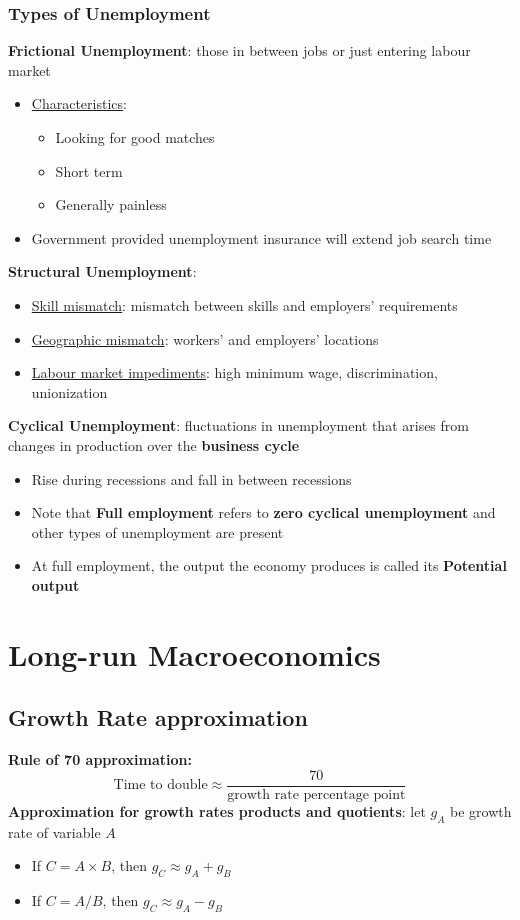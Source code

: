 \documentclass{article}
\begin{document}
\begin{multicols}{2}
\subsubsection{Types of Unemployment}
\textbf{Frictional Unemployment}: those in between jobs or just entering labour market
\begin{itemize}
	\item \underline{Characteristics}:
	\begin{itemize}
		\item Looking for good matches
		\item Short term
		\item Generally painless
	\end{itemize}
    \item Government provided unemployment insurance will extend job search time
\end{itemize}
\textbf{Structural Unemployment}:
\begin{itemize}
	\item \underline{Skill mismatch}: mismatch between skills and employers' requirements
	\item \underline{Geographic mismatch}: workers' and employers' locations
	\item \underline{Labour market impediments}: high minimum wage, discrimination, unionization
\end{itemize}
\textbf{Cyclical Unemployment}: fluctuations in unemployment that arises from changes in production over the \textbf{business cycle}
\begin{itemize}
	\item Rise during recessions and fall in between recessions
	\item Note that \textbf{Full employment} refers to \textbf{zero cyclical unemployment} and other types of unemployment are present
	\item At full employment, the output the economy produces is called its \textbf{Potential output}
\end{itemize}

\section{Long-run Macroeconomics}


\subsection{Growth Rate approximation}
\textbf{Rule of 70 approximation:}
$$\text{Time to double} \approx \frac{70}{\text{growth rate percentage point}}$$
\textbf{Approximation for growth rates products and quotients}: let $g_A$ be growth rate of variable $A$
\begin{itemize}
	\item If $C = A \times B$, then $g_C \approx g_A + g_B$
	\item If $C = A / B$, then $g_C \approx g_A - g_B$
\end{itemize}


\end{multicols}
\end{document}

